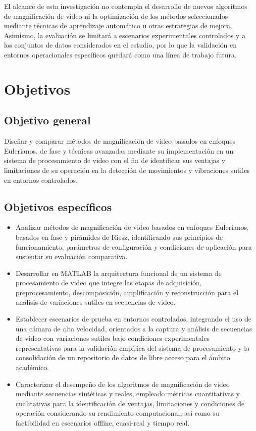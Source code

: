 El alcance de esta investigación no contempla el desarrollo de nuevos algoritmos de magnificación de video ni la optimización de los métodos seleccionados mediante técnicas de aprendizaje automático u otras estrategias de mejora. Asimismo, la evaluación se limitará a escenarios experimentales controlados y a los conjuntos de datos considerados en el estudio, por lo que la validación en entornos operacionales específicos quedará como una línea de trabajo futura.





\section{Objetivos}
\label{sec:Objetivos}

\subsection{Objetivo general}
Diseñar y comparar métodos de magnificación de video basados en enfoques Eulerianos, de fase y técnicas avanzadas mediante su implementación en un sistema de procesamiento de video con el fin de identificar sus ventajas y limitaciones de su operación en la detección de movimientos y vibraciones sutiles en entornos controlados.

\subsection{Objetivos específicos}
\begin{itemize}
    \item Analizar métodos de magnificación de video basados en enfoques Eulerianos, basados en fase y pirámides de Riesz, identificando sus principios de funcionamiento, parámetros de configuración y condiciones de aplicación para sustentar su evaluación comparativa.
		\item Desarrollar en MATLAB la arquitectura funcional de un sistema de procesamiento de video que integre las etapas de adquisición, preprocesamiento, descomposición, amplificación y reconstrucción para el análisis de variaciones sutiles en secuencias de video.
		\item Establecer escenarios de prueba en entornos controlados, integrando el uso de una cámara de alta velocidad, orientados a la captura y análisis de secuencias de video con variaciones sutiles bajo condiciones experimentales representativas para la validación empírica del sistema de procesamiento y la consolidación de un repositorio de datos de libre acceso para el ámbito académico.
		\item Caracterizar el desempeño de los algoritmos de magnificación de video mediante secuencias sintéticas y reales, empleado métricas cuantitativas y cualitativas para la identificación de ventajas, limitaciones y condiciones de operación considerando su rendimiento computacional, así como su factibilidad en escenarios offline, cuasi-real y tiempo real.
\end{itemize}